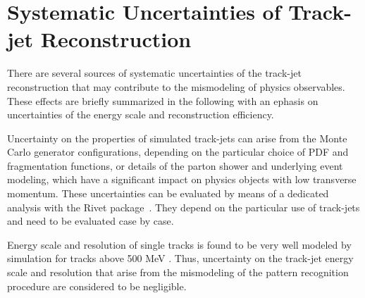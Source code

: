 

\section{Systematic Uncertainties of Track-jet Reconstruction}\label{sec:trackjetsys}

%
%


There are several sources of systematic uncertainties of the track-jet reconstruction that may contribute to
the mismodeling of physics observables.  These effects  are briefly summarized in the following with an ephasis on 
uncertainties of the energy scale and reconstruction efficiency. %

Uncertainty on the properties of simulated track-jets can arise from the Monte Carlo generator
configurations, depending on the particular choice of PDF and fragmentation functions, or details of the parton shower and underlying 
event modeling, which have a significant impact on physics objects with low transverse momentum. 
These uncertainties can be evaluated by means of a dedicated analysis with the Rivet package~\cite{RIVET}.
They depend on the particular  use of track-jets and need to be evaluated case by case.

Energy scale and resolution of single tracks is found to be very well modeled by simulation for tracks above
500 MeV \cite{IDperformance}. Thus, uncertainty on the track-jet energy scale and resolution that arise from the mismodeling of
the pattern recognition procedure are considered to be negligible. 


